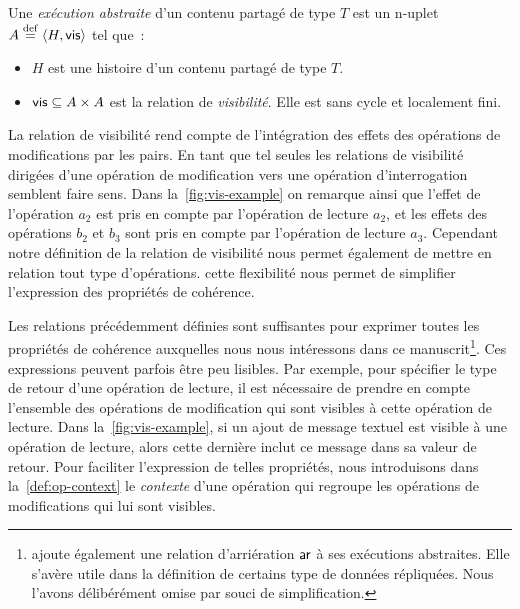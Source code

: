 \begin{definition}\label{def:abstract-exec}
Une \emph{exécution abstraite} d'un contenu partagé de type $T$ est un n-uplet $A \defeq \tuple*{H, \trm{vis}}$ tel que~:
\begin{itemize}
  \item $H$ est une histoire d'un contenu partagé de type $T$.

  \item $\trm{vis} \subseteq A \times A$ est la relation de \emph{visibilité}. Elle est sans cycle et localement fini.
\end{itemize}
\end{definition}

La relation de visibilité rend compte de l'intégration des effets des opérations de modifications par les pairs.
En tant que tel seules les relations de visibilité dirigées d'une opération de modification vers une opération d'interrogation semblent faire sens.
Dans la~\autoref{fig:vis-example} on remarque ainsi que l'effet de l'opération $a_2$ est pris en compte par l'opération de lecture $a_2$, et les effets des opérations $b_2$ et $b_3$ sont pris en compte par l'opération de lecture $a_3$.
Cependant notre définition de la relation de visibilité nous permet également de mettre en relation tout type d'opérations.
cette flexibilité nous permet de simplifier l'expression des propriétés de cohérence.

Les relations précédemment définies sont suffisantes pour exprimer toutes les propriétés de cohérence auxquelles nous nous intéressons dans ce manuscrit\footnote{\textcite{burckhardt_eventualconsistency_2014} ajoute également une relation d'arriération $\trm{ar}$ à ses exécutions abstraites. Elle s'avère utile dans la définition de certains type de données répliquées. Nous l'avons délibérément omise par souci de simplification.}.
Ces expressions peuvent parfois être peu lisibles.
Par exemple, pour spécifier le type de retour d'une opération de lecture, il est nécessaire de prendre en compte l'ensemble des opérations de modification qui sont visibles à cette opération de lecture.
Dans la~\autoref{fig:vis-example}, si un ajout de message textuel est visible à une opération de lecture, alors cette dernière inclut ce message dans sa valeur de retour.
Pour faciliter l'expression de telles propriétés, nous introduisons dans la~\autoref{def:op-context} le \emph{contexte} d'une opération qui regroupe les opérations de modifications qui lui sont visibles.

